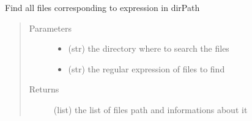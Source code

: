 \documentclass[a4paper,10pt,english]{sphinxmanual}
\begin{document}

\begin{fulllineitems}
\label{\detokenize{apidoc_src/src:src.utilsSat.label}}
\end{fulllineitems}


\begin{fulllineitems}
\label{\detokenize{apidoc_src/src:src.utilsSat.list_log_file}}
Find all files corresponding to expression in dirPath
\begin{quote}\begin{description}
\item[{Parameters}] \leavevmode\begin{itemize}
\item {} 
 \textendash{} (str) the directory where to search the files

\item {} 
 \textendash{} (str) the regular expression of files to find

\end{itemize}

\item[{Returns}] \leavevmode
(list) the list of files path and informations about it

\end{description}\end{quote}

\end{fulllineitems}


\begin{fulllineitems}
\label{\detokenize{apidoc_src/src:src.utilsSat.log_res_step}}
\end{fulllineitems}


\begin{fulllineitems}
\label{\detokenize{apidoc_src/src:src.utilsSat.log_step}}
\end{fulllineitems}
\end{document}
